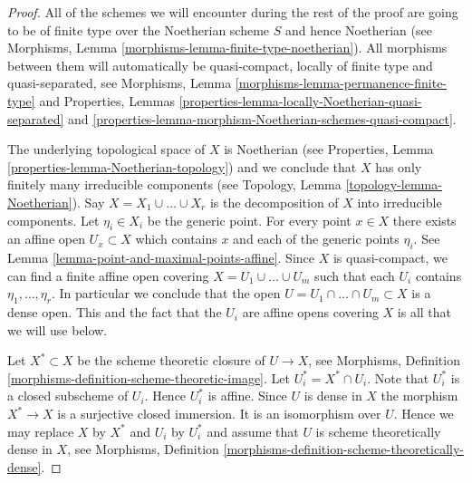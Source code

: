 \begin{proof}
All of the schemes we will encounter during the rest of the proof
are going to be of finite type over the Noetherian scheme $S$ and
hence Noetherian
(see Morphisms, Lemma \ref{morphisms-lemma-finite-type-noetherian}).
All morphisms between them will automatically be quasi-compact, locally of
finite type and quasi-separated, see
Morphisms, Lemma \ref{morphisms-lemma-permanence-finite-type} and
Properties,
Lemmas \ref{properties-lemma-locally-Noetherian-quasi-separated} and
\ref{properties-lemma-morphism-Noetherian-schemes-quasi-compact}.

\medskip\noindent
The underlying topological space of $X$ is Noetherian
(see Properties, Lemma \ref{properties-lemma-Noetherian-topology})
and we conclude that $X$ has only finitely many irreducible components
(see Topology, Lemma \ref{topology-lemma-Noetherian}).
Say $X = X_1 \cup \ldots \cup X_r$ is the decomposition
of $X$ into irreducible components.
Let $\eta_i \in X_i$ be the generic point.
For every point $x \in X$ there exists an affine open
$U_x \subset X$ which contains $x$ and each of the generic
points $\eta_i$. See Lemma \ref{lemma-point-and-maximal-points-affine}. 
Since $X$ is quasi-compact, we can find a finite affine open
covering $X = U_1 \cup \ldots \cup U_m$ such that
each $U_i$ contains $\eta_1, \ldots, \eta_r$.
In particular we conclude that the open
$U = U_1 \cap \ldots \cap U_m \subset X$ is
a dense open. This and the fact that the $U_i$ are affine opens
covering $X$ is all that we will use below.

\medskip\noindent
Let $X^* \subset X$ be the scheme theoretic closure of $U \to X$, see
Morphisms, Definition \ref{morphisms-definition-scheme-theoretic-image}.
Let $U_i^* = X^* \cap U_i$. Note that $U_i^*$ is a closed subscheme
of $U_i$. Hence $U_i^*$ is affine. Since $U$ is dense in $X$ the
morphism $X^* \to X$ is a surjective closed immersion. It is an
isomorphism over $U$. Hence we may replace $X$ by $X^*$ and
$U_i$ by $U_i^*$ and assume that $U$ is scheme theoretically dense
in $X$, see
Morphisms, Definition \ref{morphisms-definition-scheme-theoretically-dense}.


\end{proof}
